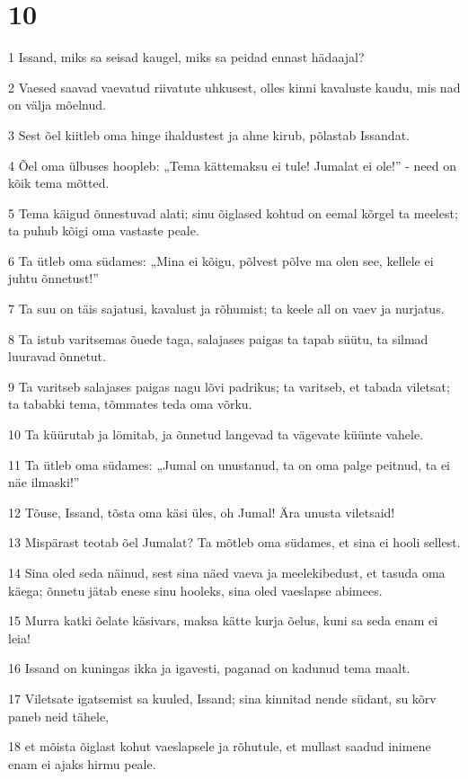 \chapter{10}

\par 1 Issand, miks sa seisad kaugel, miks sa peidad ennast hädaajal?
\par 2 Vaesed saavad vaevatud riivatute uhkusest, olles kinni kavaluste kaudu, mis nad on välja mõelnud.
\par 3 Sest õel kiitleb oma hinge ihaldustest ja ahne kirub, põlastab Issandat.
\par 4 Õel oma ülbuses hoopleb: „Tema kättemaksu ei tule! Jumalat ei ole!” - need on kõik tema mõtted.
\par 5 Tema käigud õnnestuvad alati; sinu õiglased kohtud on eemal kõrgel ta meelest; ta puhub kõigi oma vastaste peale.
\par 6 Ta ütleb oma südames: „Mina ei kõigu, põlvest põlve ma olen see, kellele ei juhtu õnnetust!”
\par 7 Ta suu on täis sajatusi, kavalust ja rõhumist; ta keele all on vaev ja nurjatus.
\par 8 Ta istub varitsemas õuede taga, salajases paigas ta tapab süütu, ta silmad luuravad õnnetut.
\par 9 Ta varitseb salajases paigas nagu lõvi padrikus; ta varitseb, et tabada viletsat; ta tababki tema, tõmmates teda oma võrku.
\par 10 Ta küürutab ja lömitab, ja õnnetud langevad ta vägevate küünte vahele.
\par 11 Ta ütleb oma südames: „Jumal on unustanud, ta on oma palge peitnud, ta ei näe ilmaski!”
\par 12 Tõuse, Issand, tõsta oma käsi üles, oh Jumal! Ära unusta viletsaid!
\par 13 Mispärast teotab õel Jumalat? Ta mõtleb oma südames, et sina ei hooli sellest.
\par 14 Sina oled seda näinud, sest sina näed vaeva ja meelekibedust, et tasuda oma käega; õnnetu jätab enese sinu hooleks, sina oled vaeslapse abimees.
\par 15 Murra katki õelate käsivars, maksa kätte kurja õelus, kuni sa seda enam ei leia!
\par 16 Issand on kuningas ikka ja igavesti, paganad on kadunud tema maalt.
\par 17 Viletsate igatsemist sa kuuled, Issand; sina kinnitad nende südant, su kõrv paneb neid tähele,
\par 18 et mõista õiglast kohut vaeslapsele ja rõhutule, et mullast saadud inimene enam ei ajaks hirmu peale.

